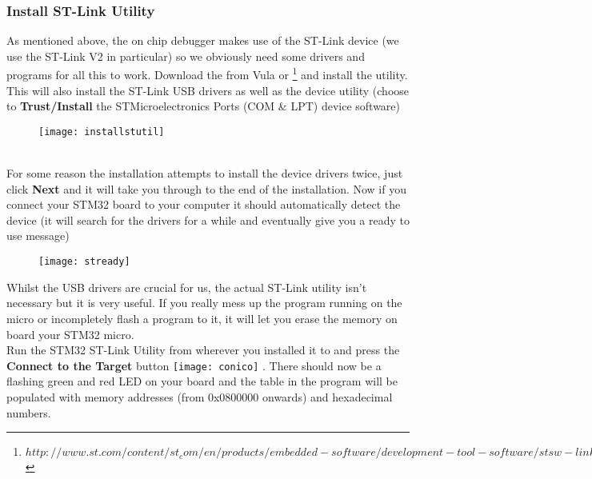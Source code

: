 \subsubsection{Install ST-Link Utility}
As mentioned above, the on chip debugger makes use of the ST-Link device (we use the ST-Link V2 in particular) so we obviously need some drivers and programs for all this to work. 
Download the {\color{Blue}\underline{}} from Vula or {\color{Blue}\underline{}}\footnote{$http://www.st.com/content/st_com/en/products/embedded-software/development-tool-software/stsw-link004.html$} and install the utility. This will also install the ST-Link USB drivers as well as the device utility (choose to \textbf{\color{Purple} Trust/Install} the STMicroelectronics Ports (COM \& LPT) device software)
\\
\begin{figure}[htbp]
\centering
\texttt{[image: installstutil]}
\end{figure}
\\
For some reason the installation attempts to install the device drivers twice, just click \textbf{Next} and it will take you through to the end of the installation. Now if you connect your STM32 board to your computer it should automatically detect the device (it will search for the drivers for a while and eventually give you a ready to use message)
\\
\begin{figure}[hbtp]
\centering
\texttt{[image: stready]}
\end{figure}
\par
Whilst the USB drivers are crucial for us, the actual ST-Link utility isn't necessary but it is very useful. If you really mess up the program running on the micro or incompletely flash a program to it, it will let you erase the memory on board your STM32 micro.
\\
Run the STM32 ST-Link Utility from wherever you installed it to and press the \textbf{\color{Purple} Connect to the Target} button 
\texttt{[image: conico]}
. There should now be a flashing green and red LED on your board and the table in the program will be populated with memory addresses (from 0x0800000 onwards) and hexadecimal numbers. 
